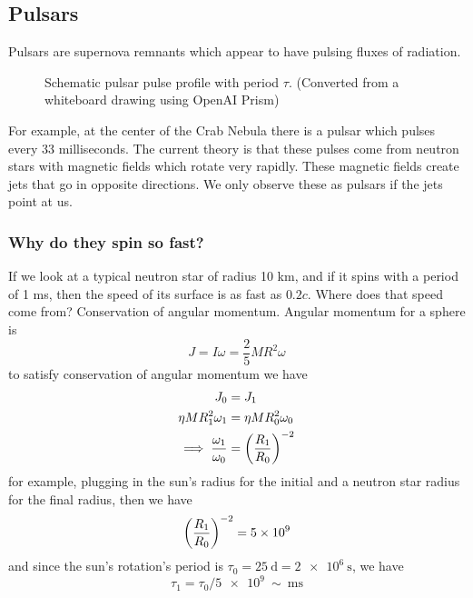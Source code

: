 \subsection{Pulsars}
Pulsars are supernova remnants which appear to have pulsing fluxes of radiation.
\begin{figure}[!htb]
    \centering
    \caption{Schematic pulsar pulse profile with period $\tau$.  (Converted from a whiteboard drawing using OpenAI Prism)}
\end{figure}
For example, at the center of the Crab Nebula there is a pulsar which pulses every 33 milliseconds. The current theory is that these pulses come from neutron stars with magnetic fields which rotate very rapidly. These magnetic fields create jets that go in opposite directions.
We only observe these as pulsars if the jets point at us. 
\subsubsection{Why do they spin so fast?}
If we look at a typical neutron star of radius 10 km, and if it spins with a period of 1 ms, then the speed of its surface is as fast as \(0.2c\). Where does that speed come from? Conservation of angular momentum. Angular momentum for a sphere is
\begin{equation}
    J = I\omega = \frac{2}{5}MR^2\omega
\end{equation}
to satisfy conservation of angular momentum we have
\begin{align}
    J_0&=J_1 \\
    \eta MR_1^2\omega_1 &= \eta MR_0^2\omega_0 \\
    \implies\frac{\omega_1}{\omega_0} &= \left(\frac{R_1}{R_0}\right)^{-2}
\end{align}
for example, plugging in the sun's radius for the initial and a neutron star radius for the final radius, then we have
\begin{equation}
    \left(\frac{R_1}{R_0}\right)^{-2} = \qty{5e9}{}
\end{equation}
and since the sun's rotation's period is \(\tau_0 = \qty{25}{\day}=\qty{2e6}{\second}\), we have
\begin{equation}
    \tau_1 = \tau_0/\qty{5e9}{} \sim \qty{}{\milli\second}
\end{equation}
